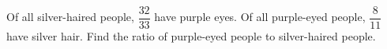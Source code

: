 Of all silver-haired people, $\dfrac{32}{33}$ have purple eyes. Of all purple-eyed people, $\dfrac{8}{11}$ have silver hair. Find the ratio of purple-eyed people to silver-haired people.
